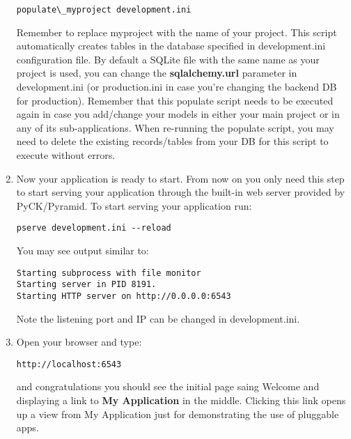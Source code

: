 \documentclass[letterpaper,10pt,english]{sphinxmanual}
\begin{document}
\begin{enumerate}
\begin{Verbatim}[commandchars=\\\{\}]
populate\_myproject development.ini
\end{Verbatim}

Remember to replace myproject with the name of your project. This script automatically creates tables in the database specified in development.ini configuration file. By default a SQLite file with the same name as your project is used, you can change the \textbf{sqlalchemy.url} parameter in development.ini (or production.ini in case you're changing the backend DB for production). Remember that this populate script needs to be executed again in case you add/change your models in either your main project or in any of its sub-applications. When re-running the populate script, you may need to delete the existing records/tables from your DB for this script to execute without errors.

\item {} 
Now your application is ready to start. From now on you only need this step to start serving your application through the built-in web server provided by PyCK/Pyramid. To start serving your application run:

\begin{Verbatim}[commandchars=\\\{\}]
pserve development.ini --reload
\end{Verbatim}

You may see output similar to:

\begin{Verbatim}[commandchars=\\\{\}]
Starting subprocess with file monitor
Starting server in PID 8191.
Starting HTTP server on http://0.0.0.0:6543
\end{Verbatim}

Note the listening port and IP can be changed in development.ini.

\item {} 
Open your browser and type:

\begin{Verbatim}[commandchars=\\\{\}]
http://localhost:6543
\end{Verbatim}

and congratulations you should see the initial page saing Welcome and displaying a link to \textbf{My Application} in the middle. Clicking this link opens up a view from My Application just for demonstrating the use of pluggable apps.

\end{enumerate}
\end{document}
